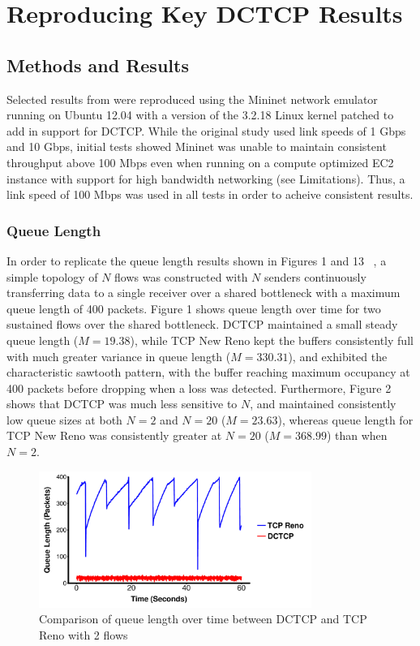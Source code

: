 \section{Reproducing Key DCTCP Results}

\subsection{Methods and Results}

Selected results from \cite{alizadeh_data_2010} were reproduced using the Mininet network emulator running on Ubuntu 12.04 with a version of the 3.2.18 Linux kernel patched to add in support for DCTCP. While the original study used link speeds of 1 Gbps and 10 Gbps, initial tests showed Mininet was unable to maintain consistent throughput above 100 Mbps even when running on a compute optimized EC2 instance with support for high bandwidth networking (see Limitations). Thus, a link speed of 100 Mbps was used in all tests in order to acheive consistent results.

\subsubsection{Queue Length}

In order to replicate the queue length results shown in Figures 1 and 13 ~\cite{alizadeh_data_2010}, a simple topology of $N$ flows was constructed with $N$ senders continuously transferring data to a single receiver over a shared bottleneck with a maximum queue length of 400 packets. Figure 1 shows queue length over time for two sustained flows over the shared bottleneck. DCTCP maintained a small steady queue length ($M = 19.38$), while TCP New Reno kept the buffers consistently full with much greater variance in queue length ($M = 330.31$), and exhibited the characteristic sawtooth pattern, with the buffer reaching maximum occupancy at 400 packets before dropping when a loss was detected. Furthermore, Figure 2 shows that DCTCP was much less sensitive to $N$, and maintained consistently low queue sizes at both $N = 2$ and $N = 20$ ($M = 23.63$), whereas queue length for TCP New Reno was consistently greater at $N = 20$ ($M = 368.99$) than when $N = 2$.

\begin{figure}
\includegraphics[height=1.75in,width=3.5in]{queue_2_flows}
\caption{Comparison of queue length over time between DCTCP and TCP Reno with 2 flows}
\end{figure}

